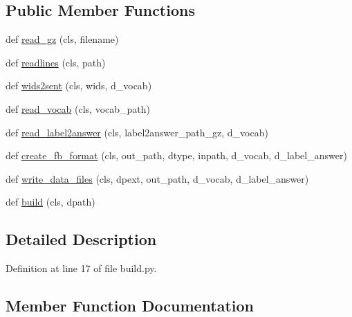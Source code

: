 \subsection*{Public Member Functions}
\begin{DoxyCompactItemize}
\item 
def \hyperlink{classparlai_1_1tasks_1_1insuranceqa_1_1build_1_1ParseInsuranceQA_a3f2322d59e42f329387912bd3d03c888}{read\+\_\+gz} (cls, filename)
\item 
def \hyperlink{classparlai_1_1tasks_1_1insuranceqa_1_1build_1_1ParseInsuranceQA_af8b1135c593e04b80b602d717a3b30d3}{readlines} (cls, path)
\item 
def \hyperlink{classparlai_1_1tasks_1_1insuranceqa_1_1build_1_1ParseInsuranceQA_afb5e7fdf077dea815bdd256c5a750069}{wids2sent} (cls, wids, d\+\_\+vocab)
\item 
def \hyperlink{classparlai_1_1tasks_1_1insuranceqa_1_1build_1_1ParseInsuranceQA_ade9a2ccdc949872bb85c31c9440d5e82}{read\+\_\+vocab} (cls, vocab\+\_\+path)
\item 
def \hyperlink{classparlai_1_1tasks_1_1insuranceqa_1_1build_1_1ParseInsuranceQA_a24c20a520141dbc602a242780281ee6d}{read\+\_\+label2answer} (cls, label2answer\+\_\+path\+\_\+gz, d\+\_\+vocab)
\item 
def \hyperlink{classparlai_1_1tasks_1_1insuranceqa_1_1build_1_1ParseInsuranceQA_a05c7792ef7e45fe67f6e964d2f73f852}{create\+\_\+fb\+\_\+format} (cls, out\+\_\+path, dtype, inpath, d\+\_\+vocab, d\+\_\+label\+\_\+answer)
\item 
def \hyperlink{classparlai_1_1tasks_1_1insuranceqa_1_1build_1_1ParseInsuranceQA_abd3ae5efba9775554d68e911fd36c840}{write\+\_\+data\+\_\+files} (cls, dpext, out\+\_\+path, d\+\_\+vocab, d\+\_\+label\+\_\+answer)
\item 
def \hyperlink{classparlai_1_1tasks_1_1insuranceqa_1_1build_1_1ParseInsuranceQA_a94f69218557d222da922e0de7f41f75a}{build} (cls, dpath)
\end{DoxyCompactItemize}


\subsection{Detailed Description}


Definition at line 17 of file build.\+py.



\subsection{Member Function Documentation}
\mbox{\label{classparlai_1_1tasks_1_1insuranceqa_1_1build_1_1ParseInsuranceQA_a94f69218557d222da922e0de7f41f75a}} 
